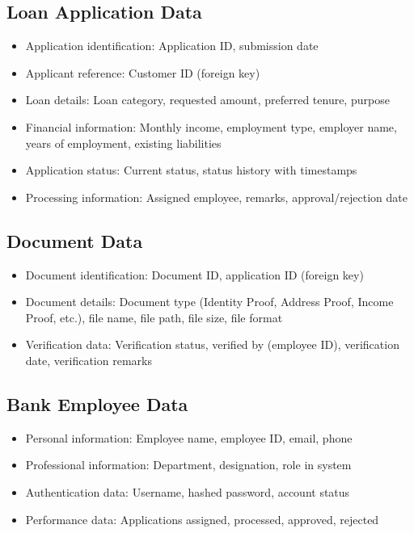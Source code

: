 \subsection{Loan Application Data}

\begin{itemize}
  \item Application identification: Application ID, submission date
  \item Applicant reference: Customer ID (foreign key)
  \item Loan details: Loan category, requested amount, preferred tenure, purpose
  \item Financial information: Monthly income, employment type, employer name, years of employment, existing liabilities
  \item Application status: Current status, status history with timestamps
  \item Processing information: Assigned employee, remarks, approval/rejection date
\end{itemize}

\subsection{Document Data}

\begin{itemize}
  \item Document identification: Document ID, application ID (foreign key)
  \item Document details: Document type (Identity Proof, Address Proof, Income Proof, etc.), file name, file path, file size, file format
  \item Verification data: Verification status, verified by (employee ID), verification date, verification remarks
\end{itemize}

\subsection{Bank Employee Data}

\begin{itemize}
  \item Personal information: Employee name, employee ID, email, phone
  \item Professional information: Department, designation, role in system
  \item Authentication data: Username, hashed password, account status
  \item Performance data: Applications assigned, processed, approved, rejected
\end{itemize}

